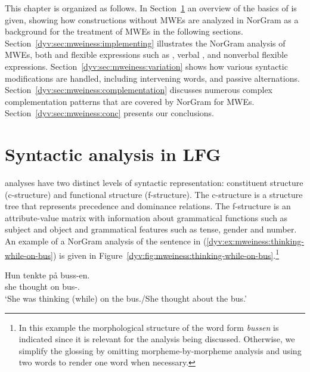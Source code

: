 \documentclass[output=paper]{langsci/langscibook}
\begin{document}
This chapter is organized as follows.
In Section~\ref{dyv:sec:mweiness:LFG} an overview of the basics of  is given, showing how constructions without MWEs are analyzed in NorGram as a background for the treatment of MWEs in the following sections.
Section~\ref{dyv:sec:mweiness:implementing} illustrates the NorGram analysis of MWEs, both  and flexible expressions such as , verbal , and nonverbal flexible expressions.
Section~\ref{dyv:sec:mweiness:variation} shows how various syntactic modifications are handled, including intervening words,  and passive alternations.
Section~\ref{dyv:sec:mweiness:complementation} discusses numerous complex complementation patterns that are covered by NorGram for  MWEs.
Section~\ref{dyv:sec:mweiness:conc} presents our conclusions.

\section{Syntactic analysis in LFG}\label{dyv:sec:mweiness:LFG}

 analyses have two distinct levels of syntactic representation: constituent structure (c-structure) and functional structure (f-structure).
The c-structure is a  structure tree that represents precedence and dominance relations.
The f-structure is an attribute-value matrix with information about grammatical functions such as subject and object and grammatical features such as tense, gender and number.
An example of a NorGram analysis of the sentence in (\ref{dyv:ex:mweiness:thinking-while-on-bus}) is given in Figure~\ref{dyv:fig:mweiness:thinking-while-on-bus}.\footnote{In this example the morphological structure of the word form \textit{bussen} is indicated since it is relevant for the analysis being discussed.
Otherwise, we simplify the glossing by omitting morpheme-by-morpheme analysis and using two  words to render one  word when necessary.}

\ea\label{dyv:ex:mweiness:thinking-while-on-bus}
\gll Hun tenkte på buss-en. \\
     she thought on bus-{}.{\sg}\\
\glt `She was thinking (while) on the bus./She thought about the bus.’
\z
\end{document}
